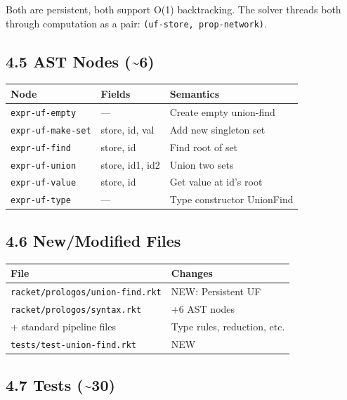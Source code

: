 \documentclass[11pt]{article}
\begin{document}
Both are persistent, both support O(1) backtracking. The solver threads both
through computation as a pair: \texttt{(uf-store, prop-network)}.
\subsection{4.5 AST Nodes (\textasciitilde{}6)}
\label{sec:orga22fb40}

\begin{center}
\begin{tabular}{lll}
Node & Fields & Semantics\\
\hline
\texttt{expr-uf-empty} & — & Create empty union-find\\
\texttt{expr-uf-make-set} & store, id, val & Add new singleton set\\
\texttt{expr-uf-find} & store, id & Find root of set\\
\texttt{expr-uf-union} & store, id1, id2 & Union two sets\\
\texttt{expr-uf-value} & store, id & Get value at id's root\\
\texttt{expr-uf-type} & — & Type constructor UnionFind\\
\end{tabular}
\end{center}
\subsection{4.6 New/Modified Files}
\label{sec:orgbd958d2}

\begin{center}
\begin{tabular}{ll}
File & Changes\\
\hline
\texttt{racket/prologos/union-find.rkt} & NEW: Persistent UF\\
\texttt{racket/prologos/syntax.rkt} & +6 AST nodes\\
+ standard pipeline files & Type rules, reduction, etc.\\
\texttt{tests/test-union-find.rkt} & NEW\\
\end{tabular}
\end{center}
\subsection{4.7 Tests (\textasciitilde{}30)}
\label{sec:org8031ace}
\end{document}
